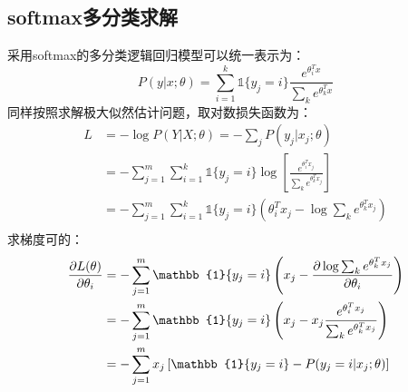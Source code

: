 \subsection{softmax多分类求解}
采用softmax的多分类逻辑回归模型可以统一表示为：
\begin{equation*}
    P(y|x;\theta) = \sum_{i=1}^k \mathbb{1}\{ y_j=i \} \frac{e^{\theta_i^T x}}{\sum_k e^{\theta_k^T x}}
\end{equation*}
同样按照求解极大似然估计问题，取对数损失函数为：
\begin{align*}
    L &= -\log P(Y|X;\theta) = -\sum_j P(y_j|x_j;\theta) \\
    &= -\sum_{j=1}^{m} \sum_{i=1}^k \mathbb{1}\{ y_j=i \} \log \left[\frac{e^{\theta_i^T x_j}}{\sum_k e^{\theta_k^T x_j}} \right] \\
    &= -\sum_{j=1}^{m} \sum_{i=1}^k \mathbb{1}\{ y_j=i \} \left( \theta_i^T x_j - \log \sum_k e^{\theta_k^T x_j} \right)\\
\end{align*}
求梯度可的：
\begin{align*}
    \Q{L(\theta)}{\theta_i} &= -\sum_{j=1}^{m} \mathbb{1}\{ y_j=i \} \left(x_j - \Q{\log \sum_k e^{\theta_k^T x_j}}{\theta_i} \right)\\
    &= -\sum_{j=1}^{m} \mathbb{1}\{ y_j=i \} \left(x_j - x_j \frac{e^{\theta_i^T x_j}}{\sum_k e^{\theta_k^T x_j}} \right)\\
    &= -\sum_{j=1}^{m} x_j \left[ \mathbb{1}\{ y_j=i \} - P(y_j=i|x_j;\theta) \right]
\end{align*}